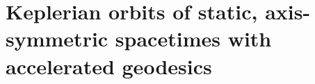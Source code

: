 \section{Keplerian orbits of static, axis-symmetric spacetimes with accelerated geodesics}
\label{appendix:circular-orbits}